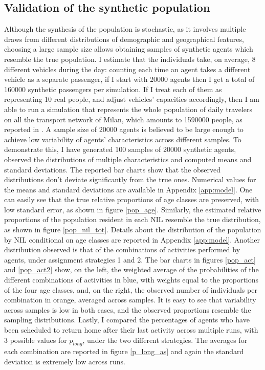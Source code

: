 
\subsection*{Validation of the synthetic population}\label{ssec:3.3.1}

Although the synthesis of the population is stochastic, as it involves multiple draws from different distributions of demographic and geographical features, choosing a large sample size allows obtaining samples of synthetic agents which resemble the true population. I estimate that the individuals take, on average, 8 different vehicles during the day: counting each time an agent takes a different vehicle as a separate passenger, if I start with 20000 agents then I get a total of 160000 synthetic passengers per simulation. If I treat each of them as representing 10 real people, and adjust vehicles' capacities accordingly, then I am able to run a simulation that represents the whole population of daily travelers on all the transport network of Milan, which amounts to 1590000 people, as reported in \cite{site20}. A sample size of 20000 agents is believed to be large enough to achieve low variability of agents' characteristics across different samples. To demonstrate this, I have generated 100 samples of 20000 synthetic agents, observed the distributions of multiple characteristics and computed means and standard deviations. The reported bar charts show that the observed distributions don't deviate significantly from the true ones. Numerical values for the means and standard deviations are available in Appendix \ref{app:model}.
One can easily see that the true relative proportions of age classes are preserved, with low standard error, as shown in figure \ref{pop_age}. Similarly, the estimated relative proportions of the population resident in each NIL resemble the true distribution, as shown in figure \ref{pop_nil_tot}. Details about the distribution of the population by NIL conditional on age classes are reported in Appendix \ref{app:model}. Another distribution observed is that of the combinations of activities performed by agents, under assignment strategies 1 and 2. The bar charts in figures \ref{pop_act} and \ref{pop_act2} show, on the left, the weighted average of the probabilities of the different combinations of activities in blue, with weights equal to the proportions of the four age classes, and, on the right, the observed number of individuals per combination in orange, averaged across samples. It is easy to see that variability across samples is low in both cases, and the observed proportions resemble the sampling distributions. Lastly, I compared the percentages of agents who have been scheduled to return home after their last activity across multiple runs, with 3 possible values for $p_{long}$, under the two different strategies. The averages for each combination are reported in figure \ref{p_long_as} and again the standard deviation is extremely low across runs.

